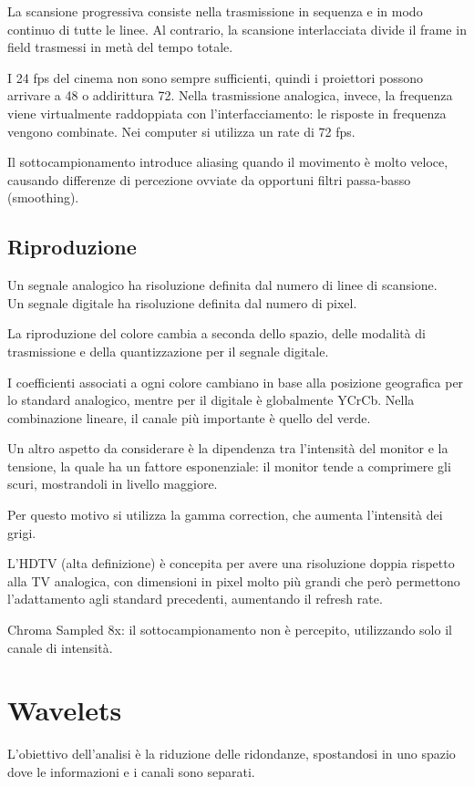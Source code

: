 La scansione progressiva consiste nella trasmissione in sequenza e in modo continuo di tutte le linee. Al contrario, la scansione interlacciata divide il frame in field trasmessi in metà del tempo totale.

I 24 fps del cinema non sono sempre sufficienti, quindi i proiettori possono arrivare a 48 o addirittura 72. Nella trasmissione analogica, invece, la frequenza viene virtualmente raddoppiata con l'interfacciamento: le risposte in frequenza vengono combinate. Nei computer si utilizza un rate di 72 fps.

Il sottocampionamento introduce aliasing quando il movimento è molto veloce, causando differenze di percezione ovviate da opportuni filtri passa-basso (smoothing). 

\subsection{Riproduzione}
Un segnale analogico ha risoluzione definita dal numero di linee di scansione. \\
Un segnale digitale ha risoluzione definita dal numero di pixel.

La riproduzione del colore cambia a seconda dello spazio, delle modalità di trasmissione e della quantizzazione per il segnale digitale.

I coefficienti associati a ogni colore cambiano in base alla posizione geografica per lo standard analogico, mentre per il digitale è globalmente YCrCb. Nella combinazione lineare, il canale più importante è quello del verde. 

Un altro aspetto da considerare è la dipendenza tra l'intensità del monitor e la tensione, la quale ha un fattore esponenziale: il monitor tende a comprimere gli scuri, mostrandoli in livello maggiore. 

Per questo motivo si utilizza la gamma correction, che aumenta l'intensità dei grigi. 

L'HDTV (alta definizione) è concepita per avere una risoluzione doppia rispetto alla TV analogica, con dimensioni in pixel molto più grandi che però permettono l'adattamento agli standard precedenti, aumentando il refresh rate.


Chroma Sampled 8x: il sottocampionamento non è percepito, utilizzando solo il canale di intensità.

\section{Wavelets}
L'obiettivo dell'analisi è la riduzione delle ridondanze, spostandosi in uno spazio dove le informazioni e i canali sono separati. 

